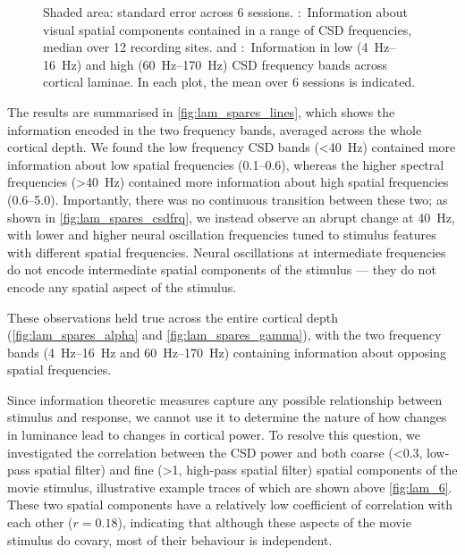 \begin{figure}[htbp]
{Shaded area: standard error across \num{6} sessions.
\protect{}:~Information about visual spatial components contained in a range of \ac{CSD} frequencies, median over \num{12} recording sites.
\protect{} and \protect{}:~Information in low (\SIrange{4}{16}{Hz}) and high (\SIrange{60}{170}{Hz}) \ac{CSD} frequency bands across cortical laminae.
In each plot, the mean over \num{6} sessions is indicated.
}%
\label{fig:lam_spares}
%
\end{figure}

The results are summarised in \autoref{fig:lam_spares_lines}, which shows the information encoded in the two frequency bands, averaged across the whole cortical depth.
We found the low frequency \ac{CSD} bands (\SI{<40}{Hz}) contained more information about low spatial frequencies (\SIrange{0.1}{0.6}{\cpd}), whereas the higher spectral frequencies (\SI{>40}{Hz}) contained more information about high spatial frequencies (\SIrange{0.6}{5.0}{\cpd}).
Importantly, there was no continuous transition between these two; as shown in \autoref{fig:lam_spares_csdfrq}, we instead observe an abrupt change at \SI{40}{Hz}, with lower and higher neural oscillation frequencies tuned to stimulus features with different spatial frequencies.
Neural oscillations at intermediate frequencies do not encode intermediate spatial components of the stimulus --- they do not encode any spatial aspect of the stimulus.

These observations held true across the entire cortical depth (\autoref{fig:lam_spares_alpha} and \autoref{fig:lam_spares_gamma}), with the two frequency bands (\SIrange{4}{16}{Hz} and \SIrange{60}{170}{Hz}) containing information about opposing spatial frequencies.

Since information theoretic measures capture any possible relationship between stimulus and response, we cannot use it to determine the nature of how changes in luminance lead to changes in cortical power.
To resolve this question, we investigated the correlation between the \ac{CSD} power and both coarse (\SI{<0.3}{\cpd}, low-pass spatial filter) and fine (\SI{>1}{\cpd}, high-pass spatial filter) spatial components of the movie stimulus, illustrative example traces of which are shown above \autoref{fig:lam_6}.
These two spatial components have a relatively low coefficient of correlation with each other ($r=0.18$), indicating that although these aspects of the movie stimulus do covary, most of their behaviour is independent.

